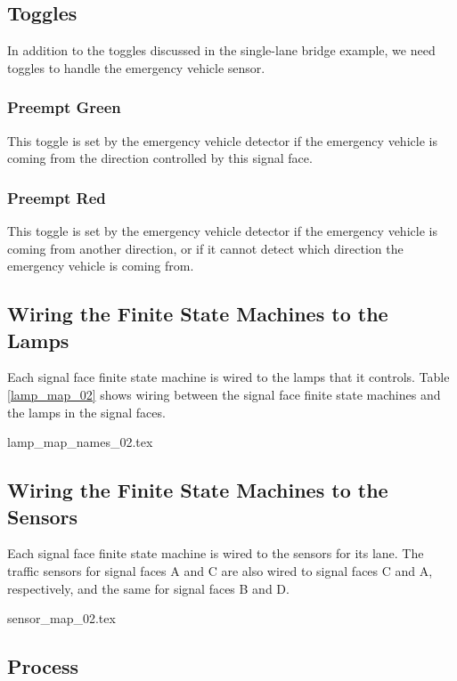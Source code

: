 \documentclass[letterpaper,twoside]{article}
\begin{document}
\subsection{Toggles}

In addition to the toggles discussed in the single-lane bridge example,
we need toggles to handle the emergency vehicle sensor.

\subsubsection{Preempt Green}

This toggle is set by the emergency vehicle detector if the emergency
vehicle is coming from the direction controlled by this signal face.

\subsubsection{Preempt Red}

This toggle is set by the emergency vehicle detector if the emergency
vehicle is coming from another direction, or if it cannot detect
which direction the emergency vehicle is coming from.

\subsection{Wiring the Finite State Machines to the Lamps}

Each signal face finite state machine is wired to the lamps that
it controls.  Table \ref{lamp_map_02} shows wiring between the signal
face finite state machines and the lamps in the signal faces.

 {lamp_map_names_02.tex}

\subsection{Wiring the Finite State Machines to the Sensors}

Each signal face finite state machine is wired to the sensors
for its lane.  The traffic sensors for signal faces A and C
are also wired to signal faces C and A, respectively, and
the same for signal faces B and D.

 {sensor_map_02.tex}

\subsection{Process}
\end{document}
